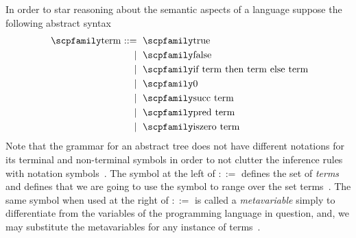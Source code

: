 \documentclass[
  oneside,
  english,
  coorientadorbanca,
  noabntexcite
]{ufsc-thesis-rn46-2019}
\def\bnfdef{::=}
\newcommand{\code}[1]{\text{\scpfamily\setlength\spaceskip{0.35em}#1}}
\newcommand{\bnfmore}[1]{            & \ & \mid{}    & \ \code{#1}}
\newcommand{\astprod}[2]{\code{#1} & \ & \bnfdef{} & \ \code{#2}}
\newcommand{\astmore}[1]{\bnfmore{#1}}
\begin{document}
In order to star reasoning about the semantic aspects of a language suppose the following abstract syntax
\begin{equation}~\label{eq:sample_term_ast}
  \begin{alignedat}{2}
    \astprod{term}{true} \\
    \astmore{false} \\
    \astmore{if term then term else term} \\
    \astmore{0} \\
    \astmore{succ term} \\
    \astmore{pred term} \\
    \astmore{iszero term}
  \end{alignedat}
\end{equation}
Note that the grammar for an abstract tree does not have different notations for its terminal and non-terminal symbols in order to not clutter the inference rules with notation symbols~\cite{pierce2002types}.
The symbol \code{term} at the left of $\bnfdef$ defines the set of \textit{terms} and defines that we are going to use the symbol \code{term} to range over the set terms~\cite{pierce2002types}.
The same symbol \code{term} when used at the right of $\bnfdef$ is called a \textit{metavariable} simply to differentiate from the variables of the programming language in question, and, we may substitute the \code{term} metavariables for any instance of terms~\cite{pierce2002types}.
\end{document}
